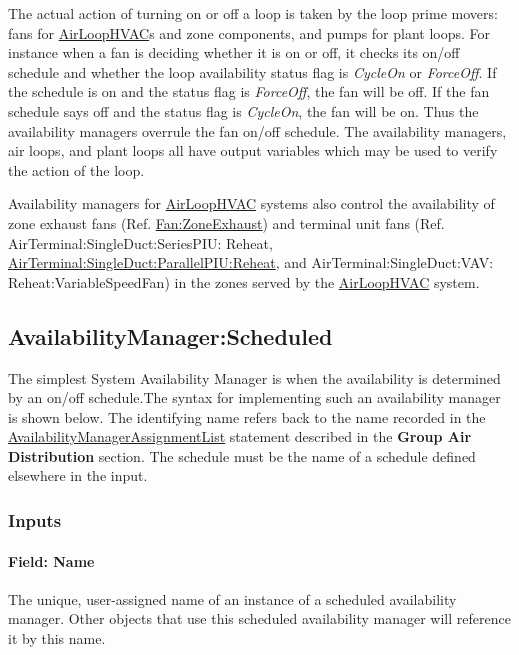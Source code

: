 The actual action of turning on or off a loop is taken by the loop prime movers: fans for \hyperref[airloophvac]{AirLoopHVAC}s and zone components, and pumps for plant loops. For instance when a fan is deciding whether it is on or off, it checks its on/off schedule and whether the loop availability status flag is \emph{CycleOn} or \emph{ForceOff}. If the schedule is on and the status flag is \emph{ForceOff}, the fan will be off. If the fan schedule says off and the status flag is \emph{CycleOn}, the fan will be on. Thus the availability managers overrule the fan on/off schedule. The availability managers, air loops, and plant loops all have output variables which may be used to verify the action of the loop.

Availability managers for \hyperref[airloophvac]{AirLoopHVAC} systems also control the availability of zone exhaust fans (Ref. \hyperref[fanzoneexhaust]{Fan:ZoneExhaust}) and terminal unit fans (Ref. AirTerminal:SingleDuct:SeriesPIU: Reheat, \hyperref[airterminalsingleductparallelpiureheat]{AirTerminal:SingleDuct:ParallelPIU:Reheat}, and AirTerminal:SingleDuct:VAV: Reheat:VariableSpeedFan) in the zones served by the \hyperref[airloophvac]{AirLoopHVAC} system.

\subsection{AvailabilityManager:Scheduled}\label{availabilitymanagerscheduled}

The simplest System Availability Manager is when the availability is determined by an on/off schedule.The syntax for implementing such an availability manager is shown below. The identifying name refers back to the name recorded in the \hyperref[availabilitymanagerassignmentlist]{AvailabilityManagerAssignmentList} statement described in the \textbf{Group Air Distribution} section. The schedule must be the name of a schedule defined elsewhere in the input.

\subsubsection{Inputs}\label{inputs-047}

\paragraph{Field: Name}\label{field-name-046}

The unique, user-assigned name of an instance of a scheduled availability manager. Other objects that use this scheduled availability manager will reference it by this name.

